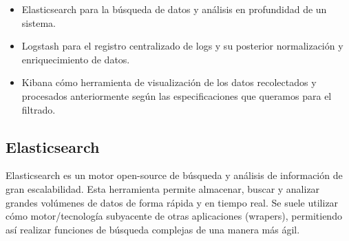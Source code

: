 
\begin{itemize}
\item Elasticsearch para la búsqueda de datos y análisis en profundidad de un sistema.
\item Logstash para el registro centralizado de logs y su posterior normalización y enriquecimiento de datos.
\item Kibana cómo herramienta de visualización de los datos recolectados y procesados anteriormente según las especificaciones que queramos para el filtrado.
\end{itemize}

\subsection{Elasticsearch}
Elasticsearch es un motor open-source de búsqueda y análisis de información de gran escalabilidad. Esta herramienta permite almacenar, buscar y analizar grandes volúmenes de datos de forma rápida y en tiempo real. Se suele utilizar cómo motor/tecnología subyacente de otras aplicaciones (wrapers), permitiendo así realizar funciones de búsqueda complejas de una manera más ágil.\\

